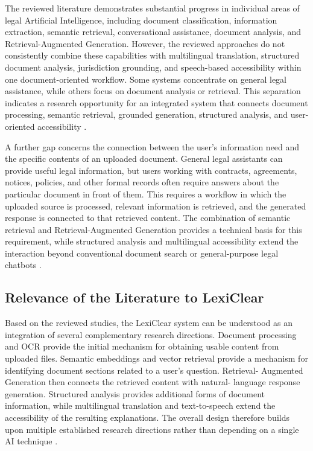 \documentclass[12pt,a4paper,oneside]{report}
\begin{document}
The reviewed literature demonstrates substantial progress in individual areas
of legal Artificial Intelligence, including document classification,
information extraction, semantic retrieval, conversational assistance,
document analysis, and Retrieval-Augmented Generation. However, the reviewed
approaches do not consistently combine these capabilities with multilingual
translation, structured document analysis, jurisdiction grounding, and
speech-based accessibility within one document-oriented workflow. Some
systems concentrate on general legal assistance, while others focus on
document analysis or retrieval. This separation indicates a research
opportunity for an integrated system that connects document processing,
semantic retrieval, grounded generation, structured analysis, and
user-oriented accessibility
\cite{nethriya2024,jurisai2025}.

A further gap concerns the connection between the user's information need and
the specific contents of an uploaded document. General legal assistants can
provide useful legal information, but users working with contracts,
agreements, notices, policies, and other formal records often require answers
about the particular document in front of them. This requires a workflow in
which the uploaded source is processed, relevant information is retrieved,
and the generated response is connected to that retrieved content. The
combination of semantic retrieval and Retrieval-Augmented Generation provides
a technical basis for this requirement, while structured analysis and
multilingual accessibility extend the interaction beyond conventional
document search or general-purpose legal chatbots
\cite{reimers2019sbert,lewis2020rag,jurisai2025}.

\subsection{Relevance of the Literature to LexiClear}

Based on the reviewed studies, the LexiClear system can be understood as an
integration of several complementary research directions. Document processing
and OCR provide the initial mechanism for obtaining usable content from
uploaded files. Semantic embeddings and vector retrieval provide a mechanism
for identifying document sections related to a user's question. Retrieval-
Augmented Generation then connects the retrieved content with natural-
language response generation. Structured analysis provides additional forms
of document information, while multilingual translation and text-to-speech
extend the accessibility of the resulting explanations. The overall design
therefore builds upon multiple established research directions rather than
depending on a single AI technique
\cite{pramanik2025,lewis2020rag,ash2024translating}.
\end{document}
